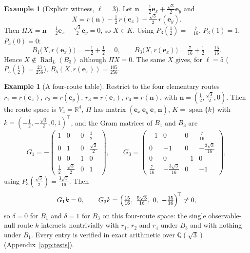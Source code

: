 \documentclass[11pt,a4paper]{article}
\newcommand{\RR}{\mathbb{R}}
\newcommand{\Rad}{\operatorname{Rad}}
\newcommand{\spn}{\operatorname{span}}
\newcommand{\defic}{\delta}
\theoremstyle{plain}
\theoremstyle{definition}
\newtheorem{example}[theorem]{Example}
\begin{document}
\begin{example}[Explicit witness, $\ell=3$]\label{ex:P3}
Let $\mathbf n=\tfrac12\mathbf e_x+\tfrac{\sqrt3}2\mathbf e_y$ and
\[ X=r(\mathbf n)-\tfrac12\,r(\mathbf e_x)-\tfrac{\sqrt3}2\,r(\mathbf e_y). \]
Then $\Pi X=\mathbf n-\tfrac12\mathbf e_x-\tfrac{\sqrt3}2\mathbf e_y=0$, so $X\in K$. Using $P_3(\tfrac12)=-\tfrac7{16}$, $P_3(1)=1$, $P_3(0)=0$:
\[ B_1\bigl(X,r(\mathbf e_x)\bigr)=-\tfrac12+\tfrac12=0,\qquad
 B_3\bigl(X,r(\mathbf e_x)\bigr)=\tfrac7{16}+\tfrac12=\tfrac{15}{16}. \]
Hence $X\notin\Rad_L(B_3)$ although $\Pi X=0$. The same $X$ gives, for $\ell=5$ ($P_5(\tfrac12)=\tfrac{23}{256}$), $B_5(X,r(\mathbf e_x))=\tfrac{105}{256}$.
\end{example}

\begin{example}[A four-route table]\label{ex:four}
Restrict to the four elementary routes $r_1=r(\mathbf e_x)$, $r_2=r(\mathbf e_y)$, $r_3=r(\mathbf e_z)$, $r_4=r(\mathbf n)$, with $\mathbf n=(\tfrac12,\tfrac{\sqrt3}2,0)$. Then the route space is $V_4=\RR^4$, $\Pi$ has matrix $(\mathbf e_x\ \mathbf e_y\ \mathbf e_z\ \mathbf n)$, $K=\spn\{k\}$ with $k=(-\tfrac12,-\tfrac{\sqrt3}2,0,1)^{\!\top}$, and the Gram matrices of $B_1$ and $B_3$ are
\[
G_1=-\begin{pmatrix}1&0&0&\tfrac12\\0&1&0&\tfrac{\sqrt3}2\\0&0&1&0\\\tfrac12&\tfrac{\sqrt3}2&0&1\end{pmatrix},\qquad
G_3=\begin{pmatrix}-1&0&0&\tfrac7{16}\\0&-1&0&-\tfrac{3\sqrt3}{16}\\0&0&-1&0\\\tfrac7{16}&-\tfrac{3\sqrt3}{16}&0&-1\end{pmatrix},
\]
using $P_3(\tfrac{\sqrt3}2)=\tfrac{3\sqrt3}{16}$. Then
\[ G_1k=0,\qquad G_3k=\Bigl(\tfrac{15}{16},\ \tfrac{5\sqrt3}{16},\ 0,\ -\tfrac{15}{16}\Bigr)^{\!\top}\neq0, \]
so $\defic=0$ for $B_1$ and $\defic=1$ for $B_3$ on this four-route space: the single observable-null route $k$ interacts nontrivially with $r_1$, $r_2$ and $r_4$ under $B_3$ and with nothing under $B_1$. Every entry is verified in exact arithmetic over $\mathbb Q(\sqrt3)$ (Appendix~\ref{app:tests}).
\end{example}
\end{document}
